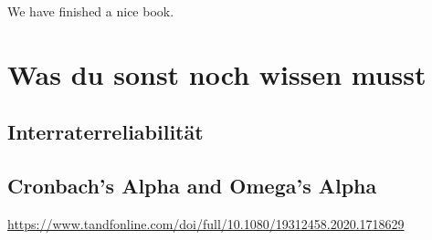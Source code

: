 \documentclass[
]{book}
\begin{document}
We have finished a nice book.

\hypertarget{was-du-sonst-noch-wissen-musst}{%
\chapter{Was du sonst noch wissen musst}\label{was-du-sonst-noch-wissen-musst}}

\hypertarget{interraterreliabilituxe4t}{%
\section{Interraterreliabilität}\label{interraterreliabilituxe4t}}

\hypertarget{cronbachs-alpha-and-omegas-alpha}{%
\section{Cronbach's Alpha and Omega's Alpha}\label{cronbachs-alpha-and-omegas-alpha}}

\url{https://www.tandfonline.com/doi/full/10.1080/19312458.2020.1718629}

  
\end{document}
